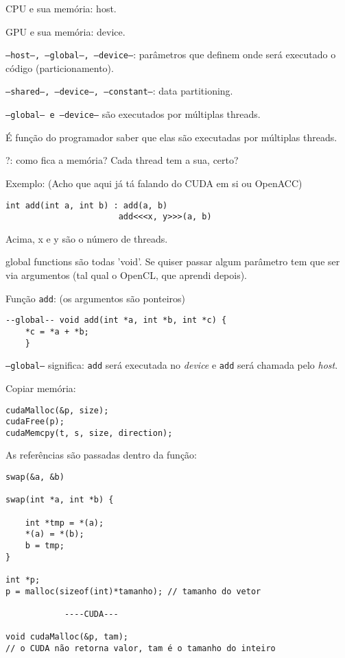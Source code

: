 \documentclass[12pt]{report} %
\begin{document}
CPU e sua memória: host.

GPU e sua memória: device.

\texttt{--host--, --global--, --device--}: parâmetros que definem onde será executado o código (particionamento).

\texttt{--shared--, --device--, --constant--}: data partitioning.

\texttt{--global-- e --device--} são executados por múltiplas threads.

É função do programador saber que elas são executadas por múltiplas threads.

?: como fica a memória? Cada thread tem a sua, certo?

Exemplo: (Acho que aqui já tá falando do CUDA em si ou OpenACC)

\begin{verbatim}
int add(int a, int b) : add(a, b)
					   add<<<x, y>>>(a, b)
\end{verbatim}
Acima, x e y são o número de threads.

global functions são todas 'void'. Se quiser passar algum parâmetro tem que 
ser via argumentos (tal qual o OpenCL, que aprendi depois).

Função \texttt{add}: (os argumentos são ponteiros)
\begin{verbatim}
--global-- void add(int *a, int *b, int *c) {
	*c = *a + *b;
	}
\end{verbatim}

\texttt{--global--} significa: \texttt{add} será executada no \textit{device} e 
\texttt{add} será chamada pelo \textit{host}.

Copiar memória:
\begin{verbatim}
cudaMalloc(&p, size);
cudaFree(p);
cudaMemcpy(t, s, size, direction);
\end{verbatim}

As referências são passadas dentro da função:

\begin{verbatim}
swap(&a, &b)

swap(int *a, int *b) {
	
	int *tmp = *(a);
	*(a) = *(b);
	b = tmp;
}

int *p;
p = malloc(sizeof(int)*tamanho); // tamanho do vetor

            ----CUDA---
            
void cudaMalloc(&p, tam); 
// o CUDA não retorna valor, tam é o tamanho do inteiro
\end{verbatim}
\end{document}

